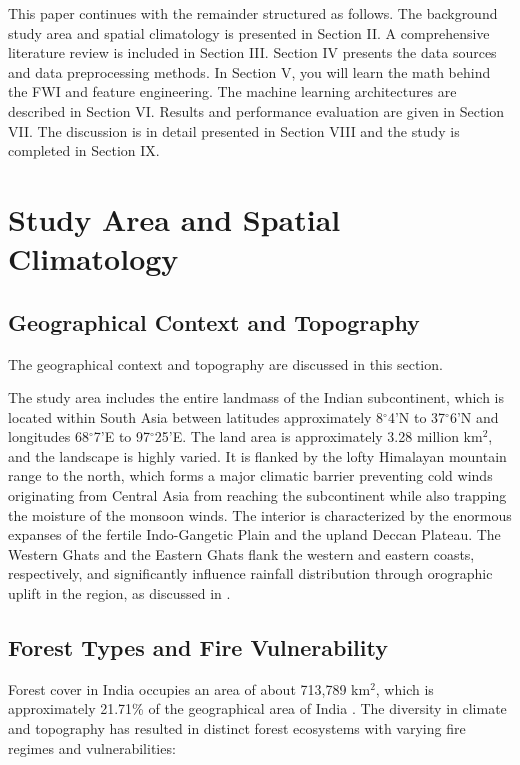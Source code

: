 \documentclass[journal, 10pt, twocolumn]{IEEEtran}
\begin{document}
This paper continues with the remainder structured as follows. The background study area and spatial climatology is presented in Section II. A comprehensive literature review is included in Section III. Section IV presents the data sources and data preprocessing methods. In Section V, you will learn the math behind the FWI and feature engineering. The machine learning architectures are described in Section VI. Results and performance evaluation are given in Section VII. The discussion is in detail presented in Section VIII and the study is completed in Section IX.
\section{Study Area and Spatial Climatology}

\subsection{Geographical Context and Topography}
The geographical context and topography are discussed in this section.

The study area includes the entire landmass of the Indian subcontinent, which is located within South Asia between latitudes approximately 8$^\circ$4'N to 37$^\circ$6'N and longitudes 68$^\circ$7'E to 97$^\circ$25'E. The land area is approximately 3.28 million km$^2$, and the landscape is highly varied. It is flanked by the lofty Himalayan mountain range to the north, which forms a major climatic barrier preventing cold winds originating from Central Asia from reaching the subcontinent while also trapping the moisture of the monsoon winds. The interior is characterized by the enormous expanses of the fertile Indo-Gangetic Plain and the upland Deccan Plateau. The Western Ghats and the Eastern Ghats flank the western and eastern coasts, respectively, and significantly influence rainfall distribution through orographic uplift in the region, as discussed in \cite{b11}.

\subsection{Forest Types and Fire Vulnerability}
Forest cover in India occupies an area of about 713,789 km$^2$, which is approximately 21.71\% of the geographical area of India \cite{b12}. The diversity in climate and topography has resulted in distinct forest ecosystems with varying fire regimes and vulnerabilities:
\end{document}

